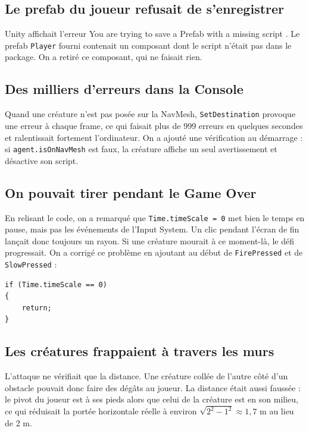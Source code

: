 \documentclass[11pt,a4paper]{article}
\begin{document}
\subsection{Le prefab du joueur refusait de s'enregistrer}
Unity affichait l'erreur \og You are trying to save a Prefab with a missing script \fg{}. Le prefab \texttt{Player} fourni contenait un composant dont le script n'était pas dans le package. On a retiré ce composant, qui ne faisait rien.

\subsection{Des milliers d'erreurs dans la Console}
Quand une créature n'est pas posée sur la NavMesh, \texttt{SetDestination} provoque une erreur à chaque frame, ce qui faisait plus de 999 erreurs en quelques secondes et ralentissait fortement l'ordinateur. On a ajouté une vérification au démarrage : si \texttt{agent.isOnNavMesh} est faux, la créature affiche un seul avertissement et désactive son script.

\subsection{On pouvait tirer pendant le Game Over}
En relisant le code, on a remarqué que \texttt{Time.timeScale = 0} met bien le temps en pause, mais pas les événements de l'Input System. Un clic pendant l'écran de fin lançait donc toujours un rayon. Si une créature mourait à ce moment-là, le défi progressait. On a corrigé ce problème en ajoutant au début de \texttt{FirePressed} et de \texttt{SlowPressed} :
\begin{lstlisting}
if (Time.timeScale == 0)
{
    return;
}
\end{lstlisting}

\subsection{Les créatures frappaient à travers les murs}
L'attaque ne vérifiait que la distance. Une créature collée de l'autre côté d'un obstacle pouvait donc faire des dégâts au joueur. La distance était aussi faussée : le pivot du joueur est à ses pieds alors que celui de la créature est en son milieu, ce qui réduisait la portée horizontale réelle à environ $\sqrt{2^2 - 1^2} \approx 1{,}7$ m au lieu de 2 m.
\end{document}

